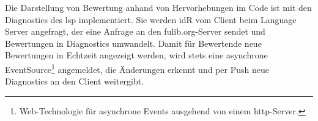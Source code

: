 Die Darstellung von Bewertung anhand von Hervorhebungen im Code ist mit den Diagnostics des \ac{lsp} implementiert.
Sie werden \ac{idR} vom Client beim Language Server angefragt, der eine Anfrage an den fulib.org-Server sendet und Bewertungen in Diagnostics umwandelt.
Damit für Bewertende neue Bewertungen in Echtzeit angezeigt werden, wird stets eine asynchrone EventSource\footnote{
    Web-Technologie für asynchrone Events ausgehend von einem \ac{http}-Server.
} angemeldet, die Änderungen erkennt und per Push neue Diagnostics an den Client weitergibt.
